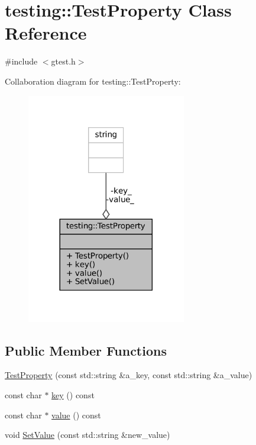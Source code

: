 \hypertarget{classtesting_1_1TestProperty}{}\section{testing\+:\+:Test\+Property Class Reference}
\label{classtesting_1_1TestProperty}


{\ttfamily \#include $<$gtest.\+h$>$}



Collaboration diagram for testing\+:\+:Test\+Property\+:
\nopagebreak
\begin{figure}[H]
\begin{center}
\leavevmode
\includegraphics[width=197pt]{classtesting_1_1TestProperty__coll__graph}
\end{center}
\end{figure}
\subsection*{Public Member Functions}
\begin{DoxyCompactItemize}
\item 
\hyperlink{classtesting_1_1TestProperty_a25a0ccf1c75a92af46a48d3c2a873e6d}{Test\+Property} (const std\+::string \&a\+\_\+key, const std\+::string \&a\+\_\+value)
\item 
const char $\ast$ \hyperlink{classtesting_1_1TestProperty_ad60435d4ad04ac030487d8998fc61c5f}{key} () const
\item 
const char $\ast$ \hyperlink{classtesting_1_1TestProperty_ad423a07af33c88b0c9ed33ee74815a63}{value} () const
\item 
void \hyperlink{classtesting_1_1TestProperty_a377245335d9f614cd06d1650e3358e1d}{Set\+Value} (const std\+::string \&new\+\_\+value)
\end{DoxyCompactItemize}
